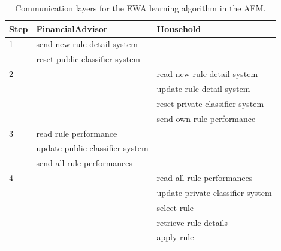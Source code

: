 \documentclass[a4paper,11pt]{article}
\begin{document}
\begin{table}
  \centering
  \begin{tabular}{|l|l|l|}
  \hline
  Step & FinancialAdvisor & Household \\
  \hline\hline
    1 & send new rule detail system &   \\
      & reset public classifier system &   \\
    \hline
    2 &                             & read new rule detail system \\
      &                             & update rule detail system \\
      &                             & reset private classifier system \\
      &                             & send own rule performance \\
    \hline
    3 & read rule performance       &  \\
      & update public classifier system &   \\
      & send all rule performances  &  \\  \hline
    4 &                             & read all rule performances \\
      &                             & update private classifier system \\
      &                             & select rule\\
      &                             & retrieve rule details\\
      &                             & apply rule\\      
  \hline
  \end{tabular}
  \caption{Communication layers for the EWA learning algorithm in the AFM.}
  \label{Table: messages}
\end{table}
\end{document}

